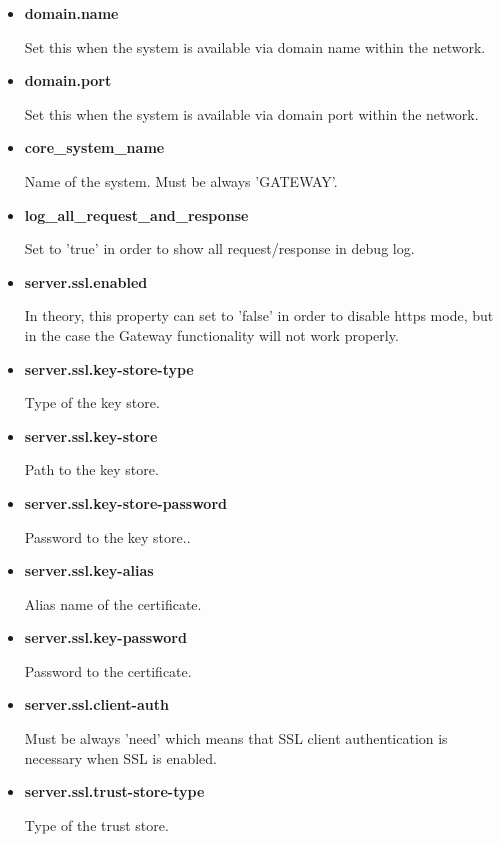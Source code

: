\documentclass[a4paper]{arrowhead}
\begin{document}
\begin{itemize}
  \item \textbf{domain.name}
  
  Set this when the system is available via domain name within the network.
  
  \item \textbf{domain.port}
  
  Set this when the system is available via domain port within the network.

  \item \textbf{core\_system\_name}
  
  Name of the system. Must be always 'GATEWAY'.
  
  \item \textbf{log\_all\_request\_and\_response}
  
  Set to 'true' in order to show all request/response in debug log.
  
  \item \textbf{server.ssl.enabled}
  
  In theory, this property can set to 'false' in order to disable https mode, but in the case the Gateway functionality will not work properly.
  
  \item \textbf{server.ssl.key-store-type}
  
  Type of the key store.
  
  \item \textbf{server.ssl.key-store}
  
  Path to the key store.
  
  \item \textbf{server.ssl.key-store-password}
  
  Password to the key store..
  
  \item \textbf{server.ssl.key-alias}
  
  Alias name of the certificate.
  
  \item \textbf{server.ssl.key-password}
  
  Password to the certificate.
  
  \item \textbf{server.ssl.client-auth}
  
  Must be always 'need' which means that SSL client authentication is necessary when SSL is enabled.
  
  \item \textbf{server.ssl.trust-store-type}
  
  Type of the trust store.
  

\end{itemize}
\end{document}
